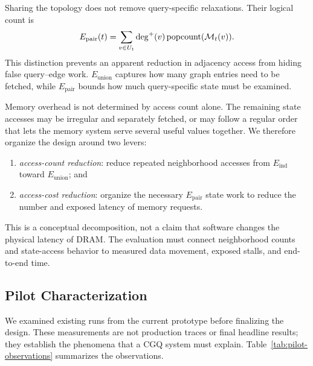 Sharing the topology does not remove query-specific relaxations.  Their logical count is
\begin{equation}
  E_{\mathrm{pair}}(t)=
    \sum_{v\in U_t}\deg^+(v)\,\mathrm{popcount}(\mathcal{M}_t(v)).
\end{equation}
This distinction prevents an apparent reduction in adjacency access from hiding false query--edge work.  $E_{\mathrm{union}}$ captures how many graph entries need to be fetched, while $E_{\mathrm{pair}}$ bounds how much query-specific state must be examined.

Memory overhead is not determined by access count alone.  The remaining state accesses may be irregular and separately fetched, or may follow a regular order that lets the memory system serve several useful values together.  We therefore organize the design around two levers:
\begin{enumerate}
  \item \emph{access-count reduction}: reduce repeated neighborhood accesses from $E_{\mathrm{ind}}$ toward $E_{\mathrm{union}}$; and
  \item \emph{access-cost reduction}: organize the necessary $E_{\mathrm{pair}}$ state work to reduce the number and exposed latency of memory requests.
\end{enumerate}
This is a conceptual decomposition, not a claim that software changes the physical latency of DRAM.  The evaluation must connect neighborhood counts and state-access behavior to measured data movement, exposed stalls, and end-to-end time.

\subsection{Pilot Characterization}

We examined existing runs from the current prototype before finalizing the design.  These measurements are not production traces or final headline results; they establish the phenomena that a CGQ system must explain.  Table~\ref{tab:pilot-observations} summarizes the observations.

